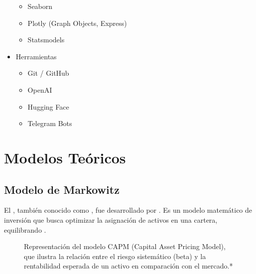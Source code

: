\documentclass[letterpaper,10pt,spanish]{sphinxmanual}
\begin{document}
\begin{itemize}
\begin{itemize}
\item {} 
\sphinxAtStartPar
Seaborn

\item {} 
\sphinxAtStartPar
Plotly (Graph Objects, Express)

\item {} 
\sphinxAtStartPar
Statsmodels

\end{itemize}

\item {} 
\sphinxAtStartPar
Herramientas
\begin{itemize}
\item {} 
\sphinxAtStartPar
Git / GitHub

\item {} 
\sphinxAtStartPar
OpenAI

\item {} 
\sphinxAtStartPar
Hugging Face

\item {} 
\sphinxAtStartPar
Telegram Bots

\end{itemize}

\end{itemize}

\sphinxstepscope


\chapter{Modelos Teóricos}
\label{\detokenize{MarcoTeorico:modelos-teoricos}}\label{\detokenize{MarcoTeorico::doc}}

\section{Modelo de Markowitz}
\label{\detokenize{MarcoTeorico:modelo-de-markowitz}}\label{\detokenize{MarcoTeorico:id1}}
\sphinxAtStartPar
El , también conocido como , fue desarrollado por . Es un modelo matemático de inversión que busca optimizar la asignación de activos en una cartera, equilibrando .

\begin{figure}[htbp]
\centering
\capstart

\noindent{}
\caption{ Representación del modelo CAPM (Capital Asset Pricing Model), que ilustra la relación entre el riesgo sistemático (beta) y la rentabilidad esperada de un activo en comparación con el mercado.*}\label{\detokenize{MarcoTeorico:id2}}\end{figure}
\end{document}
